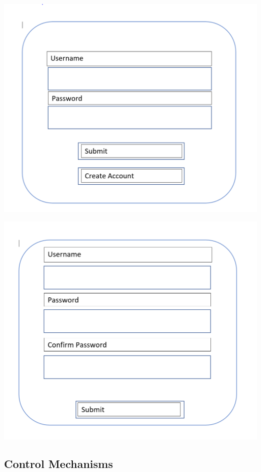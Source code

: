 \documentclass{article}
\begin{document}
\begin{minipage}{0.5\textwidth}
\includegraphics[width=\linewidth]{loginscreen}
\end{minipage} \hfill
\begin{minipage}{0.5\textwidth}
\includegraphics[width=\linewidth]{createaccount}
\end{minipage} \hfill

\subsection{Control Mechanisms}
\end{document}
